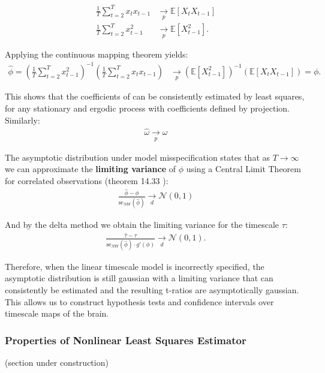 \documentclass[main.tex]{subfiles}
\begin{document}
\begin{align*}
    \frac{1}{T} \sum_{t=2}^T x_t x_{t-1} &\underset{p}{\to} \mathbb{E}[X_t X_{t-1}]\\
    \frac{1}{T} \sum_{t=2}^T x_{t-1}^2 &\underset{p}{\to} \mathbb{E}[X_{t-1}^2].
\end{align*}

Applying the continuous mapping theorem yields:
\begin{align*}
    \hat\phi = (\frac{1}{T} \sum_{t=2}^T x_{t-1}^2)^{-1} ( \frac{1}{T} \sum_{t=2}^T x_t x_{t-1}) &\underset{p}{\to} (\mathbb{E}[X_{t-1}^2])^{-1}(\mathbb{E}[X_t X_{t-1}]) = \phi.
\end{align*}

This shows that the coefficients of  can be consistently estimated by least squares, for any stationary and ergodic process with coefficients defined by projection. Similarly:
\begin{align*}
    \hat \omega \underset{p}{\to} \omega
\end{align*}

The asymptotic distribution under model misspecification states that as $T\to\infty$ we can approximate the \textbf{limiting variance} of $\phi$ using a Central Limit Theorem for correlated observations (theorem 14.33 \cite{hansen_econometrics_2022}):
\begin{align*}
\frac{\hat\phi - \phi}{\text{se}_{NW}(\hat\phi)} \underset{d}{\to} \mathcal{N}(0, 1)
\end{align*}

And by the delta method we obtain the limiting variance for the timescale $\tau$:
\begin{align*}
    \frac{\hat{\tau} - \tau}{\text{se}_{NW}(\hat{\phi}) \cdot g'(\phi)} \underset{d}{\to} \mathcal{N}(0,1).
\end{align*}

Therefore, when the linear timescale model is incorrectly specified, the asymptotic distribution is still gaussian with a limiting variance that can consistently be estimated and the resulting t-ratios are asymptotically gaussian. This allows us to construct hypothesis tests and confidence intervals over timescale maps of the brain.


\subsubsection{Properties of Nonlinear Least Squares Estimator}
(section under construction)\\
\end{document}
